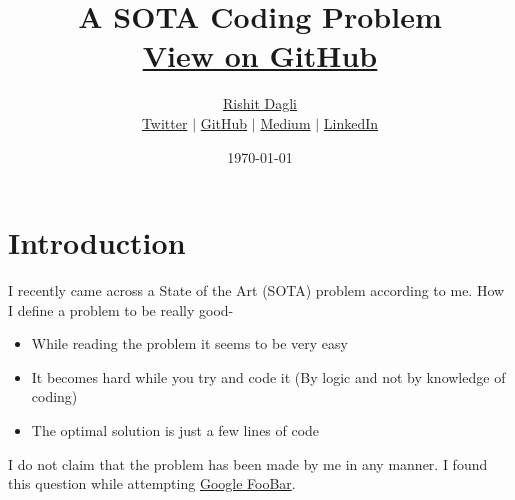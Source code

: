 \documentclass[12pt]{article}
\title{A SOTA Coding Problem\\ \href{https://github.com/Rishit-dagli/SOTA-Coding-Problem}{View on GitHub}}
\author{ \href{https://www.rishit.tech}{Rishit Dagli}\\
\href{https://twitter.com/rishit_dagli}{Twitter} $\vert$ \href{https://github.com/Rishit-dagli}{GitHub} $\vert$
\href{https://medium.com/@rishit.dagli}{Medium} $\vert$
\href{https://www.linkedin.com/in/rishit-dagli}{LinkedIn}
}
\date{\today}
\begin{document}
\setlength{\droptitle}{-5em}    

\maketitle

\section*{Introduction}

I recently came across a State of the Art (SOTA) problem according 
to me. How I define a problem to be really good-

\begin{itemize}
  \item While reading the problem it seems to be very easy
  \item It becomes hard while you try and code it (By logic and not by knowledge of coding)
  \item The optimal solution is just a few lines of code
\end{itemize}

I do not claim that the problem has been made by me in any manner. I
found this question while attempting
\href{https://foobar.withgoogle.com/}{Google FooBar}.
\end{document}
